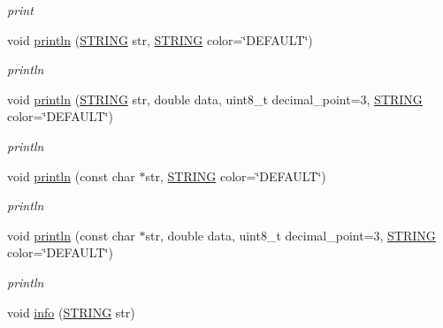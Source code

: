 \begin{DoxyCompactItemize}
\begin{DoxyCompactList}\small\item\em print \end{DoxyCompactList}\item 
void \hyperlink{namespacerobotis__manipulator_1_1log_a4a6b5b7c361aa2c61631d2c2fcfdf065}{println} (\hyperlink{robotis__manipulator__log_8h_a67f156408fa9d656017c406fe4f4b330}{S\+T\+R\+I\+NG} str, \hyperlink{robotis__manipulator__log_8h_a67f156408fa9d656017c406fe4f4b330}{S\+T\+R\+I\+NG} color=\char`\"{}D\+E\+F\+A\+U\+LT\char`\"{})
\begin{DoxyCompactList}\small\item\em println \end{DoxyCompactList}\item 
void \hyperlink{namespacerobotis__manipulator_1_1log_a9e7dea27daabd2ac128133832a7e8db8}{println} (\hyperlink{robotis__manipulator__log_8h_a67f156408fa9d656017c406fe4f4b330}{S\+T\+R\+I\+NG} str, double data, uint8\+\_\+t decimal\+\_\+point=3, \hyperlink{robotis__manipulator__log_8h_a67f156408fa9d656017c406fe4f4b330}{S\+T\+R\+I\+NG} color=\char`\"{}D\+E\+F\+A\+U\+LT\char`\"{})
\begin{DoxyCompactList}\small\item\em println \end{DoxyCompactList}\item 
void \hyperlink{namespacerobotis__manipulator_1_1log_a950fa4b4f6a187c52e5d0721c1be551c}{println} (const char $\ast$str, \hyperlink{robotis__manipulator__log_8h_a67f156408fa9d656017c406fe4f4b330}{S\+T\+R\+I\+NG} color=\char`\"{}D\+E\+F\+A\+U\+LT\char`\"{})
\begin{DoxyCompactList}\small\item\em println \end{DoxyCompactList}\item 
void \hyperlink{namespacerobotis__manipulator_1_1log_a9582bb9bfbc4a4695975ed9e3320e3a0}{println} (const char $\ast$str, double data, uint8\+\_\+t decimal\+\_\+point=3, \hyperlink{robotis__manipulator__log_8h_a67f156408fa9d656017c406fe4f4b330}{S\+T\+R\+I\+NG} color=\char`\"{}D\+E\+F\+A\+U\+LT\char`\"{})
\begin{DoxyCompactList}\small\item\em println \end{DoxyCompactList}\item 
void \hyperlink{namespacerobotis__manipulator_1_1log_ae9b5a4788629e0abb0a29e2868d6d79e}{info} (\hyperlink{robotis__manipulator__log_8h_a67f156408fa9d656017c406fe4f4b330}{S\+T\+R\+I\+NG} str)

\end{DoxyCompactItemize}
